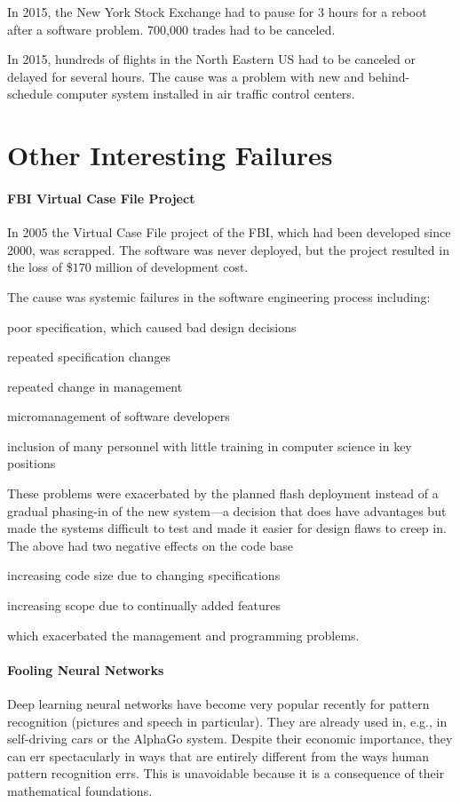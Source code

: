 In 2015, the New York Stock Exchange had to pause for $3$ hours for a reboot after a software problem.
700,000 trades had to be canceled.

In 2015, hundreds of flights in the North Eastern US had to be canceled or delayed for several hours.
The cause was a problem with new and behind-schedule computer system installed in air traffic control centers.

\section{Other Interesting Failures}

\paragraph{FBI Virtual Case File Project}
In 2005 the Virtual Case File project of the FBI, which had been developed since 2000, was scrapped.
The software was never deployed, but the project resulted in the loss of \$$170$ million of development cost.

The cause was systemic failures in the software engineering process including:
\begin{compactitem}
 \item poor specification, which caused bad design decisions
 \item repeated specification changes
 \item repeated change in management
 \item micromanagement of software developers
 \item inclusion of many personnel with little training in computer science in key positions
\end{compactitem}
These problems were exacerbated by the planned flash deployment instead of a gradual phasing-in of the new system---a decision that does have advantages but made the systems difficult to test and made it easier for design flaws to creep in.
The above had two negative effects on the code base
\begin{compactitem}
 \item increasing code size due to changing specifications
 \item increasing scope due to continually added features
\end{compactitem}
which exacerbated the management and programming problems.

\paragraph{Fooling Neural Networks}
Deep learning neural networks have become very popular recently for pattern recognition (pictures and speech in particular).
They are already used in, e.g., in self-driving cars or the AlphaGo system.
Despite their economic importance, they can err spectacularly in ways that are entirely different from the ways human pattern recognition errs.
This is unavoidable because it is a consequence of their mathematical foundations.

